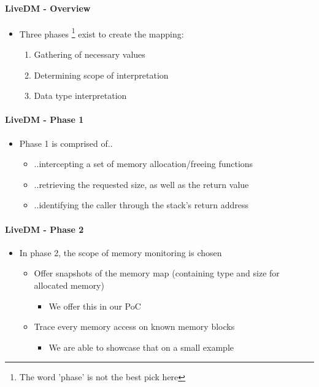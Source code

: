 \documentclass{i20lecture}
\begin{document}
\begin{frame}{\insertsection}
  \framesubtitle{LiveDM - Overview}
  
  \begin{itemize}
    \item Three phases \footnote{The word 'phase' is not the best pick here} exist to create the mapping:
    \begin{enumerate}
\pause
     \item Gathering of necessary values
\pause
     \item Determining scope of interpretation
\pause
     \item Data type interpretation
    \end{enumerate}
  \end{itemize}
\end{frame}

\begin{frame}{\insertsection}
  \framesubtitle{LiveDM - Phase 1}
  
  \begin{itemize}
    \item Phase 1 is comprised of..
    \begin{itemize}
\pause
     \item ..intercepting a set of memory allocation/freeing functions
\pause
     \item ..retrieving the requested size, as well as the return value
\pause
     \item ..identifying the caller through the stack's return address
    \end{itemize}
  \end{itemize}
\end{frame}

\begin{frame}{\insertsection}
  \framesubtitle{LiveDM - Phase 2}
  
  \begin{itemize}
    \item In phase 2, the scope of memory monitoring is chosen
    \begin{itemize}
\pause
     \item Offer snapshots of the memory map (containing type and size for allocated memory)
     \begin{itemize}
      \item We offer this in our PoC
     \end{itemize}
\pause
     \item Trace every memory access on known memory blocks
     \begin{itemize}
      \item We are able to showcase that on a small example
     \end{itemize}
    \end{itemize}
  \end{itemize}
\end{frame}
\end{document}
